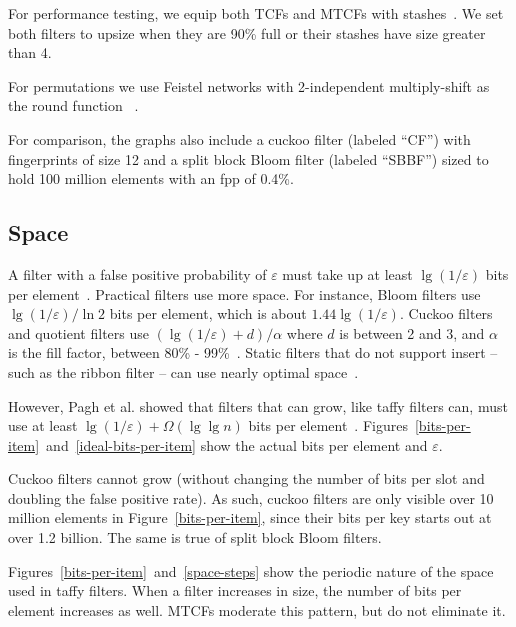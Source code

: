 \documentclass[letterpaper,twocolumn,10pt]{article}
\newcommand{\etal}{et al.}
\begin{document}
For performance testing, we equip both TCFs and MTCFs with stashes~\cite{stash}.
We set both filters to upsize when they are 90\% full or their stashes have size greater than 4.

For permutations we use Feistel networks with 2-independent multiply-shift as the round function ~\cite{two-independent-multiply-shift}.

For comparison, the graphs also include a cuckoo filter (labeled ``CF'') with fingerprints of size 12 and a split block Bloom filter (labeled ``SBBF'') sized to hold 100 million elements with an fpp of 0.4\%.

\subsection{Space}

A filter with a false positive probability of $\varepsilon$ must take up at least $\lg (1/\varepsilon)$ bits per element~\cite{lower-bound}.
Practical filters use more space.
For instance, Bloom filters use $\lg (1/\varepsilon)/\ln 2$ bits per element, which is about $1.44 \lg (1/\varepsilon)$.
Cuckoo filters and quotient filters use $(\lg (1/\varepsilon) + d) / \alpha$ where $d$ is between 2 and 3, and $\alpha$ is the fill factor, between 80\% - 99\%~\cite{cuckoo,quotient-filter,vector-quotient}.
Static filters that do not support insert -- such as the ribbon filter -- can use nearly optimal space~\cite{ribbon}.

However, Pagh \etal{} showed that filters that can grow, like taffy filters can, must use at least $\lg (1/\varepsilon) + \Omega(\lg \lg n)$ bits per element~\cite{psw}.
Figures~\ref{bits-per-item}~and~\ref{ideal-bits-per-item} show the actual bits per element and $\varepsilon$.

Cuckoo filters cannot grow (without changing the number of bits per slot and doubling the false positive rate).
As such, cuckoo filters are only visible over 10 million elements in Figure~\ref{bits-per-item}, since their bits per key starts out at over 1.2 billion.
The same is true of split block Bloom filters.

Figures~\ref{bits-per-item}~and~\ref{space-steps} show the periodic nature of the space used in taffy filters.
When a filter increases in size, the number of bits per element increases as well.
MTCFs moderate this pattern, but do not eliminate it.



\end{document}
